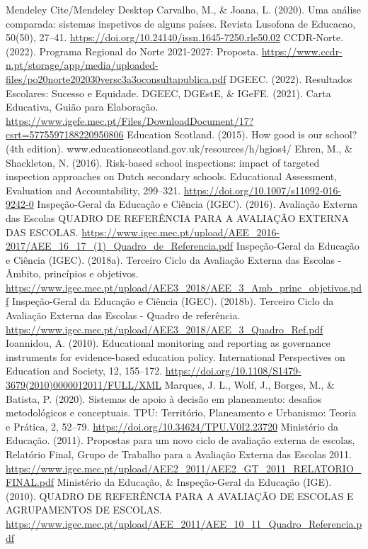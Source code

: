 \documentclass[
]{book}
\begin{document}
Mendeley Cite/Mendeley Desktop
Carvalho, M., \& Joana, L. (2020). Uma análise comparada: sistemas inspetivos de alguns países. Revista Lusofona de Educacao, 50(50), 27--41. \url{https://doi.org/10.24140/issn.1645-7250.rle50.02}
CCDR-Norte. (2022). Programa Regional do Norte 2021-2027: Proposta. \url{https://www.ccdr-n.pt/storage/app/media/uploaded-files/po20norte202030versc3a3oconsultapublica.pdf}
DGEEC. (2022). Resultados Escolares: Sucesso e Equidade.
DGEEC, DGEstE, \& IGeFE. (2021). Carta Educativa, Guião para Elaboração. \url{https://www.igefe.mec.pt/Files/DownloadDocument/17?csrt=5775597188220950806}
Education Scotland. (2015). How good is our school? (4th edition). www.educationscotland.gov.uk/resources/h/hgios4/
Ehren, M., \& Shackleton, N. (2016). Risk-based school inspections: impact of targeted inspection approaches on Dutch secondary schools. Educational Assessment, Evaluation and Accountability, 299--321. \url{https://doi.org/10.1007/s11092-016-9242-0}
Inspeção-Geral da Educação e Ciência (IGEC). (2016). Avaliação Externa das Escolas QUADRO DE REFERÊNCIA PARA A AVALIAÇÃO EXTERNA DAS ESCOLAS. \url{https://www.igec.mec.pt/upload/AEE_2016-2017/AEE_16_17_(1)_Quadro_de_Referencia.pdf}
Inspeção-Geral da Educação e Ciência (IGEC). (2018a). Terceiro Ciclo da Avaliação Externa das Escolas - Âmbito, princípios e objetivos. \url{https://www.igec.mec.pt/upload/AEE3_2018/AEE_3_Amb_princ_objetivos.pdf}
Inspeção-Geral da Educação e Ciência (IGEC). (2018b). Terceiro Ciclo da Avaliação Externa das Escolas - Quadro de referência. \url{https://www.igec.mec.pt/upload/AEE3_2018/AEE_3_Quadro_Ref.pdf}
Ioannidou, A. (2010). Educational monitoring and reporting as governance instruments for evidence-based education policy. International Perspectives on Education and Society, 12, 155--172. \url{https://doi.org/10.1108/S1479-3679(2010)0000012011/FULL/XML}
Marques, J. L., Wolf, J., Borges, M., \& Batista, P. (2020). Sistemas de apoio à decisão em planeamento: desafios metodológicos e conceptuais. TPU: Território, Planeamento e Urbanismo: Teoria e Prática, 2, 52--79. \url{https://doi.org/10.34624/TPU.V0I2.23720}
Ministério da Educação. (2011). Propostas para um novo ciclo de avaliação externa de escolas, Relatório Final, Grupo de Trabalho para a Avaliação Externa das Escolas 2011. \url{https://www.igec.mec.pt/upload/AEE2_2011/AEE2_GT_2011_RELATORIO_FINAL.pdf}
Ministério da Educação, \& Inspeção-Geral da Educação (IGE). (2010). QUADRO DE REFERÊNCIA PARA A AVALIAÇÃO DE ESCOLAS E AGRUPAMENTOS DE ESCOLAS. \url{https://www.igec.mec.pt/upload/AEE_2011/AEE_10_11_Quadro_Referencia.pdf}
\end{document}
